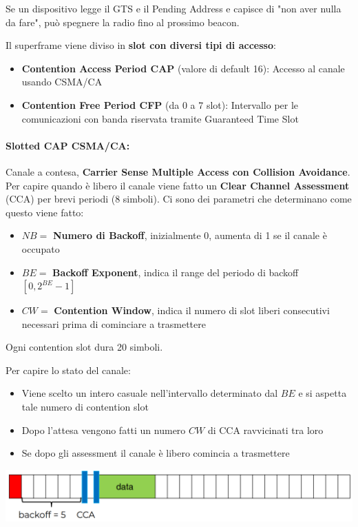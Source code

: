 Se un dispositivo legge il GTS e il Pending Address e capisce di "non aver nulla da fare", può spegnere la radio fino al prossimo beacon.

Il superframe viene diviso in \textbf{slot con diversi tipi di accesso}:
\begin{itemize}
	\item \textbf{Contention Access Period CAP} (valore di default 16): Accesso al canale usando CSMA/CA

	\item \textbf{Contention Free Period CFP} (da 0 a 7 slot): Intervallo per le comunicazioni con banda riservata tramite Guaranteed Time Slot
\end{itemize}

\paragraph{Slotted CAP CSMA/CA:} Canale a contesa, \textbf{Carrier Sense Multiple Access con Collision Avoidance}. Per capire quando è libero il canale viene fatto un \textbf{Clear Channel Assessment} (CCA) per brevi periodi (8 simboli). Ci sono dei parametri che determinano come questo viene fatto:
\begin{itemize}
	\item $NB=$ \textbf{Numero di Backoff}, inizialmente 0, aumenta di 1 se il canale è occupato
	
    \item $BE=$ \textbf{Backoff Exponent}, indica il range del periodo di backoff $[0, 2^{BE} - 1]$
	
    \item $CW=$ \textbf{Contention Window}, indica il numero di slot liberi consecutivi necessari prima di cominciare a trasmettere
\end{itemize}
Ogni contention slot dura 20 simboli.

Per capire lo stato del canale:
\begin{itemize}
    \item Viene scelto un intero casuale nell'intervallo determinato dal $BE$ e si aspetta tale numero di contention slot
    
    \item Dopo l'attesa vengono fatti un numero $CW$ di CCA ravvicinati tra loro
    
    \item Se dopo gli assessment il canale è libero comincia a trasmettere
\end{itemize}
\begin{center}
	\includegraphics[width=0.9\linewidth]{img/wpan/zex1}
\end{center}

